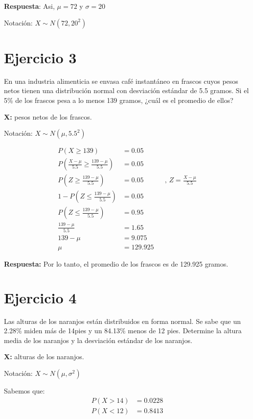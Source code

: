 \documentclass{templateNote}
\begin{document}
\textbf{Respuesta}: Asi, $\mu = 72$ y $\sigma = 20$

Notación: $X \sim N(72, 20^2)$

\newpage
\section*{Ejercicio 3}
En una industria alimenticia se envasa café instantáneo en frascos cuyos pesos netos tienen una distribución normal con desviación estándar de 5.5 gramos. Si el 5\% de los frascos pesa a lo menos 139 gramos, ¿cuál es el promedio de ellos?

\textbf{X:} pesos netos de los frascos.

Notación: $X \sim N(\mu, 5.5^2)$

\begin{align*}
  P(X \geq 139) &= 0.05 \\
  P\left(\frac{X - \mu}{5.5} \geq \frac{139 - \mu}{5.5}\right) &= 0.05 \\
  P\left(Z \geq \frac{139 - \mu}{5.5}\right) &= 0.05 && \text{, } Z = \frac{X - \mu}{5.5} \\
  1 - P\left(Z \leq \frac{139 - \mu}{5.5}\right) &= 0.05 \\
  P\left(Z \leq \frac{139 - \mu}{5.5}\right) &= 0.95 \\
  \frac{139 - \mu}{5.5} &= 1.65 \\
  139 - \mu &= 9.075 \\
  \mu &= 129.925
\end{align*}

\textbf{Respuesta:} Por lo tanto, el promedio de los frascos es de 129.925 gramos.

\newpage
\section*{Ejercicio 4}
Las alturas de los naranjos están distribuidos en forma normal. Se sabe que un 2.28\% miden más de 14pies y un 84.13\% menos de 12 pies. Determine la altura media de los naranjos y la desviación estándar de los naranjos.

\textbf{X:} alturas de los naranjos.

Notación: $X \sim N(\mu, \sigma^2)$

Sabemos que:
\begin{align*}
  P(X > 14) &= 0.0228 \\
  P(X < 12) &= 0.8413
\end{align*}
\end{document}
